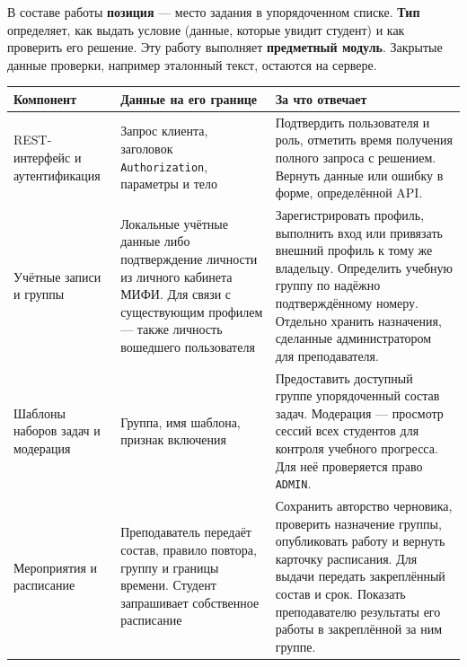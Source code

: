 \documentclass[12pt,a4paper]{article}
\begin{document}
В составе работы \textbf{позиция} --- место задания в упорядоченном списке. \textbf{Тип} определяет, как выдать условие (данные, которые увидит студент) и как проверить его решение. Эту работу выполняет \textbf{предметный модуль}. Закрытые данные проверки, например эталонный текст, остаются на сервере.

{\def\LTcaptype{none} %
\begin{longtable}[]{@{}
  >{\raggedright\arraybackslash}p{}
  >{\raggedright\arraybackslash}p{}
  >{\raggedright\arraybackslash}p{}@{}}
\toprule\noalign{}
\begin{minipage}[b]{\linewidth}\raggedright
Компонент
\end{minipage} & \begin{minipage}[b]{\linewidth}\raggedright
Данные на его границе
\end{minipage} & \begin{minipage}[b]{\linewidth}\raggedright
За что отвечает
\end{minipage} \\
\midrule\noalign{}
\endhead
\bottomrule\noalign{}
\endlastfoot
REST-интерфейс и аутентификация & Запрос клиента, заголовок \texttt{Authorization}, параметры и тело & Подтвердить пользователя и роль, отметить время получения полного запроса с решением. Вернуть данные или ошибку в форме, определённой API. \\
Учётные записи и группы & Локальные учётные данные либо подтверждение личности из личного кабинета МИФИ. Для связи с существующим профилем --- также личность вошедшего пользователя & Зарегистрировать профиль, выполнить вход или привязать внешний профиль к тому же владельцу. Определить учебную группу по надёжно подтверждённому номеру. Отдельно хранить назначения, сделанные администратором для преподавателя. \\
Шаблоны наборов задач и модерация & Группа, имя шаблона, признак включения & Предоставить доступный группе упорядоченный состав задач. Модерация --- просмотр сессий всех студентов для контроля учебного прогресса. Для неё проверяется право \texttt{ADMIN}. \\
Мероприятия и расписание & Преподаватель передаёт состав, правило повтора, группу и границы времени. Студент запрашивает собственное расписание & Сохранить авторство черновика, проверить назначение группы, опубликовать работу и вернуть карточку расписания. Для выдачи передать закреплённый состав и срок. Показать преподавателю результаты его работы в закреплённой за ним группе. \\

\end{longtable}}
\end{document}

